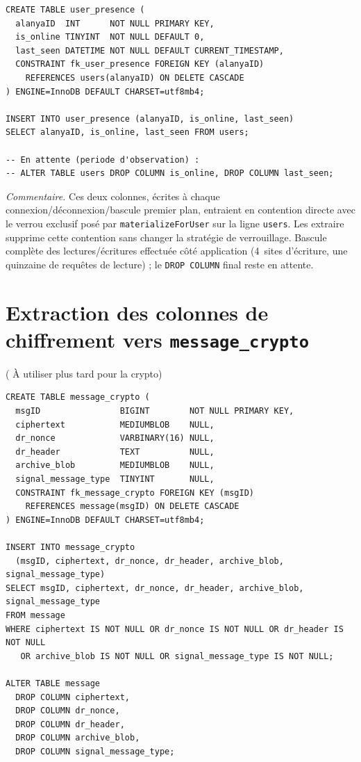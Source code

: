 \documentclass[a4paper,11pt]{article}
\begin{document}
\begin{lstlisting}
CREATE TABLE user_presence (
  alanyaID  INT      NOT NULL PRIMARY KEY,
  is_online TINYINT  NOT NULL DEFAULT 0,
  last_seen DATETIME NOT NULL DEFAULT CURRENT_TIMESTAMP,
  CONSTRAINT fk_user_presence FOREIGN KEY (alanyaID)
    REFERENCES users(alanyaID) ON DELETE CASCADE
) ENGINE=InnoDB DEFAULT CHARSET=utf8mb4;

INSERT INTO user_presence (alanyaID, is_online, last_seen)
SELECT alanyaID, is_online, last_seen FROM users;

-- En attente (periode d'observation) :
-- ALTER TABLE users DROP COLUMN is_online, DROP COLUMN last_seen;
\end{lstlisting}

\noindent\textit{Commentaire.} Ces deux colonnes, écrites à chaque connexion/déconnexion/bascule premier plan, entraient en contention directe avec le verrou exclusif posé par \texttt{materializeForUser} sur la ligne \texttt{users}. Les extraire supprime cette contention sans changer la stratégie de verrouillage. Bascule complète des lectures/écritures effectuée côté application (4~sites d'écriture, une quinzaine de requêtes de lecture) ; le \texttt{DROP COLUMN} final reste en attente.

\section{Extraction des colonnes de chiffrement vers \texttt{message\_crypto}} ( À utiliser plus tard pour la crypto)

\begin{lstlisting}
CREATE TABLE message_crypto (
  msgID                BIGINT        NOT NULL PRIMARY KEY,
  ciphertext           MEDIUMBLOB    NULL,
  dr_nonce             VARBINARY(16) NULL,
  dr_header            TEXT          NULL,
  archive_blob         MEDIUMBLOB    NULL,
  signal_message_type  TINYINT       NULL,
  CONSTRAINT fk_message_crypto FOREIGN KEY (msgID)
    REFERENCES message(msgID) ON DELETE CASCADE
) ENGINE=InnoDB DEFAULT CHARSET=utf8mb4;

INSERT INTO message_crypto
  (msgID, ciphertext, dr_nonce, dr_header, archive_blob, signal_message_type)
SELECT msgID, ciphertext, dr_nonce, dr_header, archive_blob, signal_message_type
FROM message
WHERE ciphertext IS NOT NULL OR dr_nonce IS NOT NULL OR dr_header IS NOT NULL
   OR archive_blob IS NOT NULL OR signal_message_type IS NOT NULL;

ALTER TABLE message
  DROP COLUMN ciphertext,
  DROP COLUMN dr_nonce,
  DROP COLUMN dr_header,
  DROP COLUMN archive_blob,
  DROP COLUMN signal_message_type;
\end{lstlisting}
\end{document}
